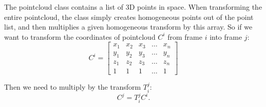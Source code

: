 The pointcloud class contains a list of 3D points in space. 
When transforming the entire pointcloud, the class simply creates homogeneous points out of the point list, and then multiplies a given homogeneous transform by this array. 
So if we want to transform the coordinates of pointcloud $C^i$ from frame $i$ into frame $j$:
\begin{equation}
	C^i = \begin{bmatrix}
		x_1 & x_2 & x_3 & \dots & x_n \\
		y_1 & y_2 & y_3 & \dots & y_n \\
		z_1 & z_2 & z_3 & \dots & z_n \\
		1 & 1 & 1 & \dots & 1
	\end{bmatrix}
\end{equation}

Then we need to multiply by the transform $T_i^j$: 
\begin{equation}
	C^j = T_i^j C^i.
\end{equation}